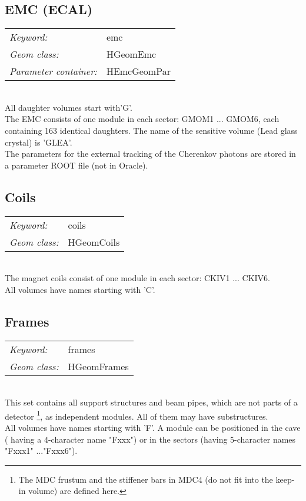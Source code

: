 \subsection*{EMC (ECAL)}

\begin{tabular}{ll}
\emph{Keyword:}             & emc \\
\emph{Geom class:}          & HGeomEmc \\
\emph{Parameter container:} & HEmcGeomPar 
\end{tabular}\\

All daughter volumes start with'G'.\\
The EMC consists of one module in each sector: GMOM1 ... GMOM6, each containing 163 identical daughters. The name of the 
sensitive volume (Lead glass crystal) is 'GLEA'.\\
The parameters for the external tracking of the Cherenkov photons are stored in a parameter ROOT file (not in Oracle).

\subsection*{Coils}

\begin{tabular}{ll}
\emph{Keyword:}             & coils \\
\emph{Geom class:}          & HGeomCoils \\
\end{tabular}\\

The magnet coils consist of one module in each sector: CKIV1 ... CKIV6.\\
All volumes have names starting with 'C'.

\subsection*{Frames}

\begin{tabular}{ll}
\emph{Keyword:}             & frames \\
\emph{Geom class:}          & HGeomFrames \\
\end{tabular}\\

This set contains all support structures and beam pipes, which are not parts of a detector \footnote{The MDC frustum 
and the stiffener bars in MDC4 (do not fit into the keep-in volume) are defined here.}, as independent modules. All of 
them may have substructures.\\
All volumes have names starting with 'F'. A module can be positioned in the cave ( having a 4-character name "Fxxx") 
or in the sectors (having 5-character names "Fxxx1" ..."Fxxx6").

